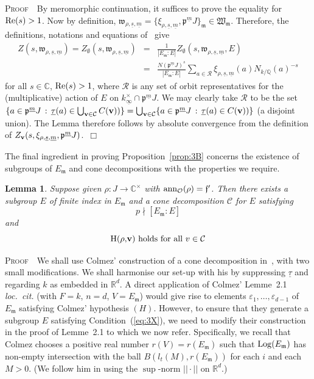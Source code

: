 \documentclass[12pt]{article}
\newtheorem{lemma}{Lemma}[section]
\newcounter{rem}[section]%
\newcommand{\bbC}{\ensuremath{\mathbb{C}}}
\newcommand{\bbQ}{\ensuremath{\mathbb{Q}}}
\newcommand{\bbR}{\ensuremath{\mathbb{R}}}
\newcommand{\beql}[1]{\begin{equation}\label{#1}}
\newcommand{\bPf}{\noindent \textsc{Proof\ }}
\newcommand{\bv}{\ensuremath{{\bf v}}}
\newcommand{\cC}{\ensuremath{\mathcal{C}}}
\newcommand{\cO}{\ensuremath{\mathcal{O}}}
\newcommand{\cR}{\ensuremath{\mathcal{R}}}
\newcommand{\eeq}{\end{equation}}
\newcommand{\ePf}{\hspace*{\fill}~$\Box$\vertsp\par}%
\newcommand{\ff}{\ensuremath{\mathfrak{f}}}
\newcommand{\fm}{\ensuremath{\mathfrak{m}}}
\newcommand{\fp}{\ensuremath{\mathfrak{p}}}
\newcommand{\fw}{\ensuremath{\mathfrak{w}}}
\newcommand{\fW}{\ensuremath{\mathfrak{W}}}
\newcommand{\ndiv}{\nmid}
\newcommand{\refeq}[1]{~(\ref{eq:#1})}
\newcommand{\rem}{\refstepcounter{rem}\noindent{\sc Remark \therem}}%
\renewcommand{\therem}{\thesection.\arabic{rem}}
\newcommand{\vertsp}{\vspace{1ex}}
\newcommand{\Hrhov}{H($\rho$,$\bv$)}
\newcommand{\uinf}{\ensuremath{{\underline{\infty}}}}
\newcommand{\um}{\ensuremath{{\underline{m}}}}
\newcommand{\us}{\ensuremath{{\underline{s}}}}
\newcommand{\utau}{\ensuremath{{\underline{\tau}}}}
\begin{document}
\bPf\ By meromorphic continuation, it suffices to prove the
equality for ${\rm Re}(s)>1$. Now by definition, $\fw_{\rho,\us,\um}=
\{\xi_{\rho,\us,\um},\fp^\um J\}_{\fm}\in\fW_\fm$. Therefore, the definitions, notations and
equations of~\cite[pp.\ 15,16]{twizas} give
\begin{eqnarray*}
Z(s,\fw_{\rho,\us,\um})=Z_\emptyset(s,\fw_{\rho,\us,\um})
                       &=&\frac{1}{|E_\fm:E|}Z_\emptyset(s,\fw_{\rho,\us,\um},E)\\
                       &=&\frac{N(\fp^\um J)^s}{|E_\fm:E|}
                          \sum_{a\in \cR}
                           \xi_{\rho,\us,\um}(a) N_{k/\bbQ}(a)^{-s}
\end{eqnarray*}
for all $s\in\bbC$, ${\rm Re}(s)>1$, where $\cR$ is any set of orbit
representatives for the (multiplicative)
action of $E$ on $k_{\uinf}^\times\cap \fp^\um J$. We may clearly take
$\cR$ to be the set $\{a\in\fp^\um J\,:\,\utau(a)\in\bigcup_{\bv\in\cC}C(\bv))\}=
\bigcup_{\bv\in\cC}\{a\in\fp^\um J\,:\,\utau(a)\in C(\bv))\}$
(a disjoint union). The Lemma therefore follows by absolute convergence from the definition
of $Z_{\bv}(s,\xi_{\rho,\us,\um},\fp^\um J)$.\ePf
\noindent The final ingredient in proving Proposition~\ref{prop:3B}
concerns the existence of subgroups of $E_\fm$ and cone decompositions
with the properties we require.
\begin{lemma}\label{lemma:3L} Suppose given $\rho: J\rightarrow\bbC^\times$ with
${\rm ann}_\cO(\rho)=\ff'$. Then there exists a subgroup $E$ of finite index
in $E_\fm$ and a cone decomposition $\cC$ for $E$ satisfying
\beql{eq:3X}
p\ndiv[E_\fm:E]
\eeq
and
\beql{eq:3Y}
\mbox{\Hrhov\ holds for all $v\in\cC$}
\eeq
\end{lemma}
\bPf\ We shall use Colmez' construction of a
cone decomposition in~\cite[\S 2]{Colm}, with two small modifications.
We shall harmonise our set-up with his by suppressing $\utau$ and
regarding $k$ as embedded in $\bbR^d$. A direct application of Colmez'
Lemme~2.1 \emph{loc.\ cit.}
(with $F=k$, $n=d$, $V=E_\fm$) would give rise to elements
$\varepsilon_1,\ldots,\varepsilon_{d-1}$ of $E_\fm$
satisfying Colmez' hypothesis $(H)$.
However, to ensure that they generate a subgroup $E$ satisfying
Condition\refeq{3X}, we need to modify their construction
in the proof of Lemme~2.1 to which we now refer.
Specifically, we recall that Colmez chooses a positive real number
$r(V)=r(E_\fm)$ such that ${\rm Log}(E_\fm)$ has non-empty intersection with the ball
$B(l_t(M),r(E_\fm))$  for each $i$ and each $M>0$.
(We follow him in using the $\sup$-norm $||\cdot||$ on $\bbR^d$.)
\end{document}
